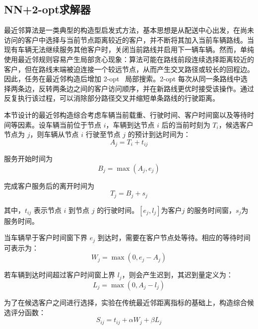 \documentclass[12pt,a4paper,UTF8]{article}
\begin{document}
\subsection{NN+2-opt求解器}
最近邻算法是一类典型的构造型启发式方法，基本思想是从配送中心出发，在尚未访问的客户中选择与当前节点距离较近的客户，并不断将其加入当前车辆路线。当现有车辆无法继续服务其他客户时，关闭当前路线并启用下一辆车辆。然而，单纯使用最近邻规则容易产生局部贪心现象：算法可能在路线前段连续选择距离较近的客户，但在路线末端被迫连接一个较远节点，从而产生交叉路径或较长的回程边。因此，任务在最近邻构造后增加 2-opt~\cite{lin1973effective} 局部搜索。2-opt 每次从同一条路线中选择两条边，反转两条边之间的客户访问顺序，并在新路线更优时接受该操作。通过反复执行该过程，可以消除部分路径交叉并缩短单条路线的行驶距离。

本节设计的最近邻构造综合考虑车辆当前载重、行驶时间、客户时间窗以及等待时间等因素。设车辆当前位于节点 $i$，车辆到达节点 $i$ 后的当前时刻为 $T_i$，候选客户节点为 $j$，则车辆从节点 $i$ 行驶至节点 $j$ 的预计到达时间为：
\begin{equation}
A_j = T_i + t_{ij}
\label{eq:nn_arrival_time}
\end{equation}

服务开始时间为
\begin{equation}
B_j = \max\left(A_j,e_j\right)
\label{eq:nn_service_start}
\end{equation}

完成客户服务后的离开时间为
\begin{equation}
T_j = B_j + s_j
\label{eq:nn_departure_time}
\end{equation}

其中，$t_{ij}$ 表示节点 $i$ 到节点 $j$ 的行驶时间。$[e_j,l_j]$为客户$j$ 的服务时间窗，$s_j$为服务时间。

当车辆早于客户时间窗下界 $e_j$ 到达时，需要在客户节点处等待。相应的等待时间可表示为：
\begin{equation}
W_j = \max\left(0,e_j-A_j\right)
\label{eq:nn_waiting_time}
\end{equation}

若车辆到达时间超过客户时间窗上界 $l_j$，则会产生迟到，其迟到量定义为：
\begin{equation}
L_j = \max\left(0,A_j-l_j\right)
\label{eq:nn_lateness}
\end{equation}

为了在候选客户之间进行选择，实验在传统最近邻距离指标的基础上，构造综合候选评分函数：
\begin{equation}
S_{ij}=t_{ij}+\alpha W_j+\beta L_j
\label{eq:nn_score}
\end{equation}
\end{document}
